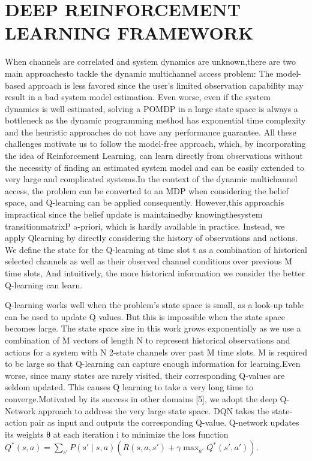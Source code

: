 \section{  DEEP REINFORCEMENT LEARNING FRAMEWORK    }
When channels are correlated and system dynamics are unknown,there are two main approachesto tackle the dynamic multichannel access problem:  The model-based approach is less favored since the user’s limited observation capability may result in a bad system model estimation. Even worse, even if the system dynamics is well estimated, solving a POMDP in a large state space is always a bottleneck as the dynamic programming method has exponential time complexity and the heuristic approaches do not have any performance guarantee. All these challenges motivate us to follow the model-free approach, which, by incorporating the idea of Reinforcement Learning, can learn directly from observations without the necessity of ﬁnding an estimated system model and can be easily extended to very large and complicated systems.In the context of the dynamic multichannel access, the problem can be converted to an MDP when considering the belief space, and Q-learning can be applied consequently. However,this approachis impractical since the belief update is maintainedby knowingthesystem transitionmatrixP a-priori, which is hardly available in practice. Instead, we apply Qlearning by directly considering the history of observations and actions. We deﬁne the state for the Q-learning at time slot t as a combination of historical selected channels as well as their observed channel conditions over previous M time slots, And intuitively, the more historical information we consider the better Q-learning can learn.

Q-learning works well when the problem’s state space is small, as a look-up table can be used to update Q values. But this is impossible when the state space becomes large. The state space size in this work grows exponentially as we use a combination of M vectors of length N to represent historical observations and actions for a system with N 2-state channels over past M time slots. M is required to be large so that Q-learning can capture enough information for learning.Even worse, since many states are rarely visited, their corresponding Q-values are seldom updated. This causes Q learning to take a very long time to converge.Motivated by its success in other domains [5], we adopt the deep Q-Network approach to address the very large state space. DQN takes the state-action pair as input and outputs the corresponding Q-value. Q-network updates its weights θ at each iteration i to minimize the loss function $Q^{*}\left ( s,a \right )=\sum _{{s}'}P\left ( {s}'\mid s,a \right )\left ( R\left ( s,a,{s}' \right ) +\gamma\max _{{a}'}Q^{*}\left ( {s}' ,{a}'\right )\right )$.

